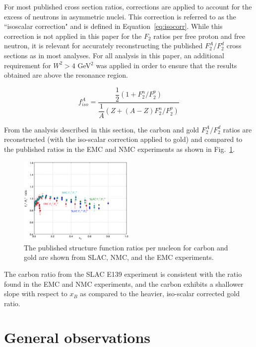 \documentclass[oneside]{article}
\begin{document}
For most published cross section ratios, corrections are applied to account for the excess of neutrons in asymmetric nuclei. This correction is referred to as the ``isoscalar correction" and is defined in Equation~\eqref{eq:isocorr}. While this correction is not applied in this paper for the $F_2$ ratios per free proton and free neutron, it is relevant for accurately reconstructing the published $F_2^A$/$F_2^d$ cross sections as in most analyses. For all analysis in this paper, an additional requirement for $W^2>4$ GeV$^2$ was applied in order to ensure that the results obtained are above the resonance region.  

\begin{equation}
f_{iso}^A = \dfrac{\dfrac{1}{2}(1+F_2^n/F_2^p)}{\dfrac{1}{A}(Z+(A-Z)F_2^n/F_2^p)}
\label{eq:isocorr}
\end{equation}

From the analysis described in this section, the carbon and gold $F_2^A/F_2^d$ ratios are reconstructed (with the iso-scalar correction applied to gold) and compared to the published ratios in the EMC and NMC experiments as shown in Fig.~\ref{fig:emc_ratios}.

\begin{figure}[H]
  \centering
      	  \includegraphics[width=0.5\textwidth]{plots/emc_ratios_data.png}
 	 \caption[EMC ratios for various data]{The published structure function ratios per nucleon for carbon and gold are shown from SLAC, NMC, and the EMC experiments.}
  \label{fig:emc_ratios}
 \end{figure}
 
 The carbon ratio from the SLAC E139 experiment is consistent with the ratio found in the EMC and NMC experiments, and the carbon exhibits a shallower slope with respect to $x_B$ as compared to the heavier, iso-scalar corrected gold ratio. 

\section{General observations}
\end{document}
